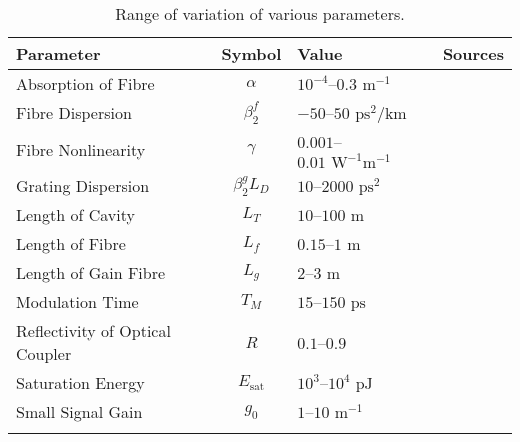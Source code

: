 \documentclass[10pt,twocolumn,a4paper]{article}
\newcommand{\Es}{E_{\textrm{sat}}}
\begin{document}
\begin{table*}[tbp]
\centering
\begin{tabular}{lcll}
\hline\noalign{\smallskip}
Parameter & Symbol & Value & Sources \\
\hline\noalign{\smallskip}
Absorption of Fibre & $\alpha$ & $10^{-4}$--$0.3\text{ m}^{-1}$  & \cite{burgoyneemail, shtyrina, tomlinson, usechak, yarutkina} \\
Fibre Dispersion & $\beta_2^f$ & $-50$--$50 \text{ ps}^2/ \text{km}$ & \cite{agrawal2002, agrawal2013, burgoyne2014, litchinitser, peng, yarutkina} \\
Fibre Nonlinearity & $\gamma$ & $0.001$--$0.01 \text{ W}^{-1} \text{m}^{-1}$ & \cite{agrawal2013, finot, usechak, yarutkina} \\
Grating Dispersion & $\beta_2^g L_D$ & $10$--$2000 \text{ ps}^2$ & \cite{agrawal2002, agrawal2013, burgoyne2014, li} \\
Length of Cavity & $L_T$ & $10$--$100 \text{ m}$ & \cite{burgoyneemail, peng, tamura1996} \\
Length of Fibre & $L_f$ & $0.15$--$1 \text{ m}$ & \cite{burgoyneemail} \\
Length of Gain Fibre & $L_g$ & $2$--$3 \text{ m}$ & \cite{burgoyne2014, peng, shtyrina, tamura1993, yarutkina} \\
Modulation Time & $T_M$ & $15$--$150 \text{ ps}$ & \cite{bohun, burgoyneemail, burgoyne2014} \\
Reflectivity of Optical Coupler & $R$ & $0.1$--$0.9$ & \cite{burgoyneemail, li, peng,  tamura1993, tamura1996, yamashita} \\
Saturation Energy & $\Es$ & $10^3$--$10^4 \text{ pJ}$ & \cite{burgoyneemail, usechak, yarutkina} \\
Small Signal Gain & $g_0$ & $1$--$10 \text{ m}^{-1}$ & \cite{burgoyneemail, yarutkina} \\
\noalign{\smallskip}\hline
\end{tabular}
\caption{Range of variation of various parameters.}
\label{tab:values}
\end{table*}
\end{document}
